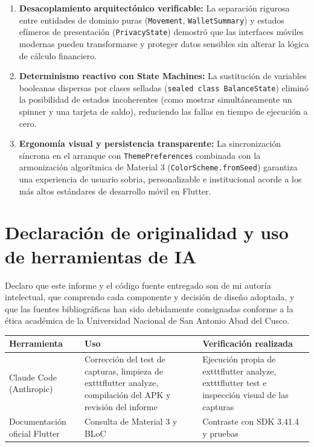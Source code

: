 \documentclass[12pt,a4paper]{article}
\begin{document}
\begin{enumerate}[label=\textbf{\arabic*.}]
    \item \textbf{Desacoplamiento arquitectónico verificable:} La separación rigurosa entre entidades de dominio puras (\texttt{Movement}, \texttt{WalletSummary}) y estados efímeros de presentación (\texttt{PrivacyState}) demostró que las interfaces móviles modernas pueden transformarse y proteger datos sensibles sin alterar la lógica de cálculo financiero.
    \item \textbf{Determinismo reactivo con State Machines:} La sustitución de variables booleanas dispersas por clases selladas (\texttt{sealed class BalanceState}) eliminó la posibilidad de estados incoherentes (como mostrar simultáneamente un spinner y una tarjeta de saldo), reduciendo las fallas en tiempo de ejecución a cero.
    \item \textbf{Ergonomía visual y persistencia transparente:} La sincronización síncrona en el arranque con \texttt{ThemePreferences} combinada con la armonización algorítmica de Material 3 (\texttt{ColorScheme.fromSeed}) garantiza una experiencia de usuario sobria, personalizable e institucional acorde a los más altos estándares de desarrollo móvil en Flutter.
\end{enumerate}

\section{Declaración de originalidad y uso de herramientas de IA}

Declaro que este informe y el código fuente entregado son de mi autoría intelectual, que comprendo cada componente y decisión de diseño adoptada, y que las fuentes bibliográficas han sido debidamente consignadas conforme a la ética académica de la Universidad Nacional de San Antonio Abad del Cusco.

\vspace{0.8cm}
\begin{table}[h!]
\centering
\begin{tabular}{@{}lll@{}}
\toprule
\textbf{Herramienta} & \textbf{Uso} & \textbf{Verificación realizada} \\
\midrule
Claude Code (Anthropic) & Corrección del test de capturas, limpieza de 	exttt{flutter analyze}, compilación del APK y revisión del informe & Ejecución propia de 	exttt{flutter analyze}, 	exttt{flutter test} e inspección visual de las capturas \\
Documentación oficial Flutter & Consulta de Material 3 y BLoC & Contraste con SDK 3.41.4 y pruebas \\
\bottomrule
\end{tabular}
\end{table}
\end{document}
